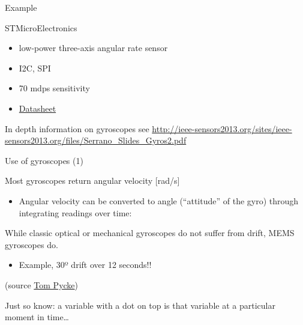 \documentclass[compress]{beamer}
\providecommand{\tightlist}{%
  \setlength{\itemsep}{0pt}\setlength{\parskip}{0pt}}
\begin{document}
\begin{frame}{Example}

STMicroElectronics

\begin{itemize}
\tightlist
\item
  low-power three-axis angular rate sensor
\item
  I2C, SPI
\item
  70 mdps sensitivity
\item
  \href{http://www.st.com/web/en/resource/technical/document/datasheet/CD00265057.pdf}{Datasheet}
\end{itemize}

In depth information on gyroscopes see
\url{http://ieee-sensors2013.org/sites/ieee-sensors2013.org/files/Serrano_Slides_Gyros2.pdf}

\end{frame}

\begin{frame}{Use of gyroscopes (1)}

Most gyroscopes return angular velocity {[}rad/s{]}

\begin{itemize}
\tightlist
\item
  Angular velocity can be converted to angle (``attitude'' of the gyro)
  through integrating readings over time:
\end{itemize}

While classic optical or mechanical gyroscopes do not suffer from drift,
MEMS gyroscopes do.

\begin{itemize}
\tightlist
\item
  Example, 30º drift over 12 seconds!!
\end{itemize}

(source
\href{http://tom.pycke.be/mav/70/gyroscope-to-roll-pitch-and-yaw}{Tom
Pycke})

Just so know: a variable with a dot on top is that variable at a
particular moment in time\ldots{}

\end{frame}
\end{document}
